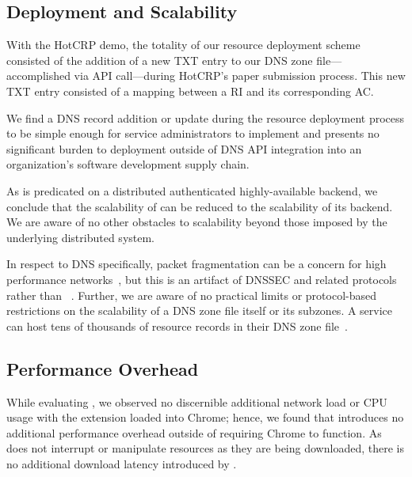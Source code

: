 


\subsection{Deployment and Scalability}

With the HotCRP demo, the totality of our resource deployment scheme consisted
of the addition of a new TXT entry to our DNS zone file---accomplished via API
call---during HotCRP's paper submission process. This new TXT entry consisted of
a mapping between a RI and its corresponding AC.

We find a DNS record addition or update during the resource deployment process
to be simple enough for service administrators to implement and presents no
significant burden to deployment outside of DNS API integration into an
organization's software development supply chain.

As \SYSTEM{} is predicated on a distributed authenticated highly-available
backend, we conclude that the scalability of \SYSTEM{} can be reduced to the
scalability of its backend. We are aware of no other obstacles to scalability
beyond those imposed by the underlying distributed system.

In respect to DNS specifically, packet fragmentation can be a concern for high
performance networks~\cite{EDNS}, but this is an artifact of DNSSEC and related
protocols rather than \SYSTEM{}~\cite{DNSSEC}. Further, we are aware of no
practical limits or protocol-based restrictions on the scalability of a DNS zone
file itself or its subzones. A service can host tens of thousands of resource
records in their DNS zone file~\cite{DNS1, DNS2}.

\subsection{Performance Overhead}

While evaluating \SYSTEM{}, we observed no discernible additional network load
or CPU usage with the extension loaded into Chrome; hence, we found that
\SYSTEM{} introduces no additional performance overhead outside of requiring
Chrome to function. As \SYSTEM{} does not interrupt or manipulate resources as
they are being downloaded, there is no additional download latency introduced by
\SYSTEM{}.

